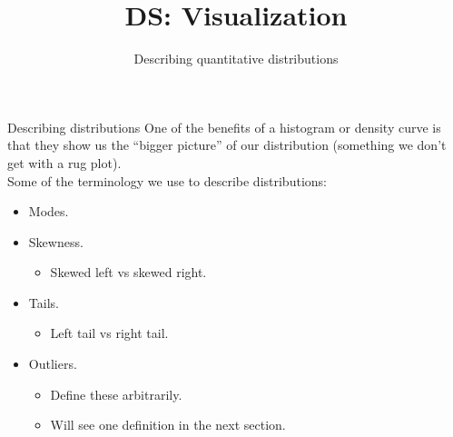 \documentclass[aspectratio=169]{../latex_main/tntbeamer}  %
\title[Visualization]{DS: Visualization}
\subtitle{Describing quantitative distributions}
\begin{document}
	
	\maketitle
	\begin{frame}{Describing distributions}
	    One of the benefits of a histogram or density curve is that they show us the “bigger picture” of our distribution (something we don’t get with a rug plot).\\
	    \bigskip
	    Some of the terminology we use to describe distributions:
	    \begin{itemize}
	        \item Modes.
	        \item Skewness.
	        \begin{itemize}
	            \item Skewed left vs skewed right.
	        \end{itemize}
	        \item Tails.
	        \begin{itemize}
	            \item Left tail vs right tail.	
	        \end{itemize}
	        \item Outliers.
	        \begin{itemize}
	            \item Define these arbitrarily.
	            \item Will see one definition in the next section.
	        \end{itemize}
	    \end{itemize}
	\end{frame}
	
	
	
\end{document}
